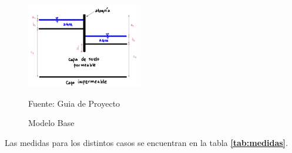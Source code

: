 \begin{figure}[H]
    \centering
    \includegraphics[width=0.45\textwidth]{FOTOS/modelo_base.png}
    \caption{Modelo Base}
    Fuente: Guia de Proyecto
    \label{fig:modelo_base}
\end{figure}

Las medidas para los distintos casos se encuentran en la tabla \textbf{\ref{tab:medidas}}.

